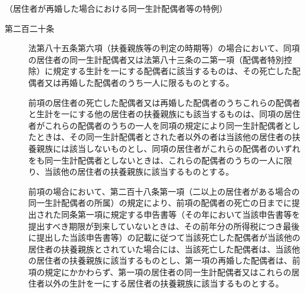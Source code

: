 \documentclass[twocolumn,a4j,10pt]{ltjtarticle}
\begin{document}
\noindent\hspace{10pt}（居住者が再婚した場合における同一生計配偶者等の特例）
\begin{description}
\item[第二百二十条]法第八十五条第六項（扶養親族等の判定の時期等）の場合において、同項の居住者の同一生計配偶者又は法第八十三条の二第一項（配偶者特別控除）に規定する生計を一にする配偶者に該当するものは、その死亡した配偶者又は再婚した配偶者のうち一人に限るものとする。
\item[]前項の居住者の死亡した配偶者又は再婚した配偶者のうちこれらの配偶者と生計を一にする他の居住者の扶養親族にも該当するものは、同項の居住者がこれらの配偶者のうちの一人を同項の規定により同一生計配偶者としたときは、その同一生計配偶者とされた者以外の者は当該他の居住者の扶養親族には該当しないものとし、同項の居住者がこれらの配偶者のいずれをも同一生計配偶者としないときは、これらの配偶者のうちの一人に限り、当該他の居住者の扶養親族に該当するものとする。
\item[]前項の場合において、第二百十八条第一項（二以上の居住者がある場合の同一生計配偶者の所属）の規定により、前項の配偶者の死亡の日までに提出された同条第一項に規定する申告書等（その年において当該申告書等を提出すべき期限が到来していないときは、その前年分の所得税につき最後に提出した当該申告書等）の記載に従つて当該死亡した配偶者が当該他の居住者の扶養親族とされていた場合には、当該死亡した配偶者は、当該他の居住者の扶養親族に該当するものとし、第一項の再婚した配偶者は、前項の規定にかかわらず、第一項の居住者の同一生計配偶者又はこれらの居住者以外の生計を一にする居住者の扶養親族に該当するものとする。
\end{description}
\end{document}
